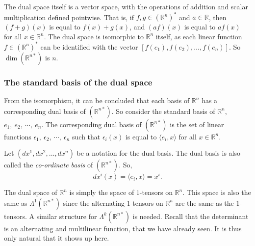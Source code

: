 \documentclass{article}
\theoremstyle{definition}
\theoremstyle{named}
\begin{document}
The dual space itself is a vector space, with the operations of addition and scalar multiplication defined pointwise. That is, if $f, g \in (\mathbb{R}^n)^*$ and $a \in \mathbb{R}$, then $(f + g)(x) $ is equal to $ f(x) + g(x)$, and $(af)(x)$ is equal to $a f(x)$ for all $x \in \mathbb{R}^n$. The dual space is isomorphic to $\mathbb{R}^n$ itself, as each linear function  $f \in (\mathbb{R}^n)^*$ can be identified with the vector $[f(e_1), f(e_2), \ldots, f(e_n)]$. So $\dim (\mathbb{R}^{n*})$ is $n$.

\subsubsection{The standard basis of the dual space}
From the isomorphism, it can be concluded that each basis of $\mathbb{R}^n$ has a corresponding dual basis of $(\mathbb{R}^{n*})$. So consider the standard basis of $\mathbb{R}^n$, $e_1,\  e_2, \ \cdots, \ e_n$. The corresponding dual basis of $(\mathbb{R}^{n*})$ is the set of linear functions $\epsilon_1, \ \epsilon_2, \ \cdots, \ \epsilon_n$ such that $\epsilon_i(x) $ is equal to $ \langle e_i, x \rangle$ for all $x \in \mathbb{R}^n$. 

 Let $(dx^1, dx^2, \ldots, dx^n)$ be a notation for the dual basis. The dual basis is also called the \textit{co-ordinate basis} of $(\mathbb{R}^{n*})$. So,
$$dx^i(x) = \langle e_i, x \rangle = x^i .$$ 

The dual space of $\mathbb{R}^n$ is simply the space of $1$-tensors on $\mathbb{R}^n$. This space is also the same as $\Lambda^1(\mathbb{R}^{n*})$ since the alternating $1$-tensors on $\mathbb{R}^n$ are the same as the $1$-tensors.
A similar structure for $\Lambda^k(\mathbb{R}^{n*})$ is needed. Recall that the determinant is an alternating and multilinear function, that we have already seen. It is thus only natural that it shows up here. 
\end{document}
